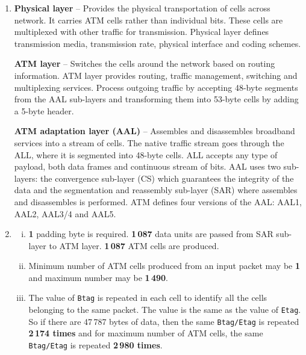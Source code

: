 \documentclass[a4paper, 11pt]{article}
\begin{document}
\begin{enumerate}

		\item %
			\textbf{Physical layer} -- Provides the physical transportation of cells across network. It carries ATM cells rather
			than individual bits. These cells are multiplexed with other traffic for transmission.
			Physical layer defines transmission media, transmission rate, physical interface and coding schemes.

			\textbf{ATM layer} -- Switches the cells around the network based on routing information. ATM layer provides routing,
			traffic management, switching and multiplexing services. Process outgoing traffic by accepting 48-byte segments from
			the AAL sub-layers and transforming them into 53-byte cells by adding a 5-byte header.

			\textbf{ATM adaptation layer (AAL)} -- Assembles and disassembles broadband services into a stream of cells. The native
			traffic stream goes through the ALL, where it is segmented into 48-byte cells. ALL accepts any type of payload, both
			data frames and continuous stream of bits. AAL uses two sub-layers: the convergence sub-layer (CS) which guarantees
			the integrity of the data and the segmentation and reassembly sub-layer (SAR) where assembles and disassembles is
			performed. ATM defines four versions of the AAL: AAL1, AAL2, AAL3/4 and AAL5.

		\item %
			\begin{enumerate}[i)]
				\item %
					\textbf{1} padding byte is required. \textbf{1\,087} data units are passed from SAR sub-layer to ATM layer.
					\textbf{1\,087} ATM cells are produced.

				\item %
					Minimum number of ATM cells produced from an input packet may be \textbf{1} and maximum number may be \textbf{1\,490}.

				\item %
					The value of \texttt{Btag} is repeated in each cell to identify all the cells belonging to the same packet. The value is
					the same as the value of \texttt{Etag}.
					So if there are 47\,787 bytes of data, then the same \texttt{Btag/Etag} is repeated \textbf{2\,174 times} and for
					maximum number of ATM cells, the same \texttt{Btag/Etag} is repeated \textbf{2\,980 times}.


\end{enumerate}
\end{enumerate}
\end{document}
